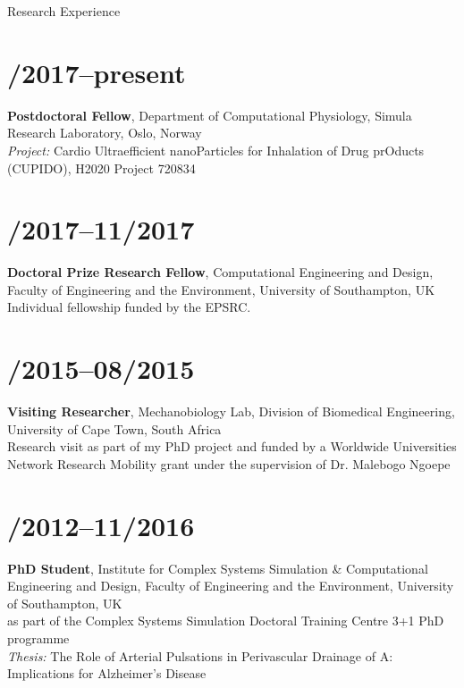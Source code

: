 \documentclass[margin,line,10pt]{res}
\begin{document}
\begin{resume}
\vspace*{-.2in}

{\sc Research Experience}\\
\vspace*{-.35in}
\section{/2017--present}{\bf Postdoctoral Fellow}, Department of Computational Physiology, Simula Research Laboratory, Oslo, Norway\\
{\em Project:} Cardio Ultraefficient nanoParticles for Inhalation of Drug prOducts (CUPIDO), H2020 Project 720834\\
\vspace*{-.35in}
\section{/2017--11/2017}{\bf Doctoral Prize Research Fellow}, Computational Engineering and Design, Faculty of Engineering and the Environment, University of Southampton, UK\\
Individual fellowship funded by the EPSRC.\\
\vspace*{-.35in}
\section{/2015--08/2015}{\bf Visiting Researcher}, Mechanobiology Lab, Division of Biomedical Engineering, University of Cape Town, South Africa\\
Research visit as part of my PhD project and funded by a Worldwide Universities Network Research Mobility grant under the supervision of Dr. Malebogo Ngoepe\\
\vspace*{-.35in}
\section{/2012--11/2016}{\bf PhD Student}, Institute for Complex Systems Simulation \& Computational Engineering and Design, Faculty of Engineering and the Environment, University of Southampton, UK\\
as part of the Complex Systems Simulation Doctoral Training Centre 3+1 PhD programme\\
{\em Thesis:} The Role of Arterial Pulsations in Perivascular Drainage of A\textbeta: Implications for Alzheimer's Disease\\    
\vspace*{-.35in}        

\end{resume}
\end{document}
